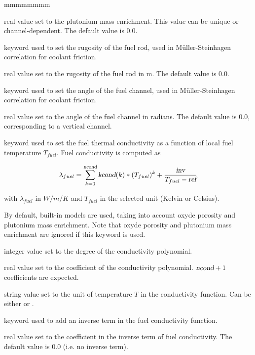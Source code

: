 \begin{ListeDeDescription}{mmmmmmmm}
\item[\dusa{pufr}] real value set to the plutonium mass enrichment. This value can be unique or channel-dependent. The default value is 0.0.

\item[\moc{F-RUG}] keyword used to set the rugosity of the fuel rod, used in M\"uller-Steinhagen correlation for coolant friction.

\item[\dusa{epsr}] real value set to the rugosity of the fuel rod in m. The default value is 0.0.

\item[\moc{THETA}] keyword used to set the angle of the fuel channel, used in M\"uller-Steinhagen correlation for coolant friction.

\item[\dusa{theta}] real value set to the angle of the fuel channel in radians. The default value is 0.0, corresponding to a vertical channel.

\item[\moc{CONDF}] keyword used to set the fuel thermal conductivity as a function of local fuel temperature $T_{fuel}$.
Fuel conductivity is computed as

$$\lambda_{fuel} = \sum_{k=0}^{\dusa{ncond}} {\dusa{kcond}(k)*(T_{fuel})^k + \frac{\dusa{inv}}{T_{fuel}-\dusa{ref}}}$$

with $\lambda_{fuel}$ in $W/m/K$ and $T_{fuel}$ in the selected unit (Kelvin or Celsius).

By default, built-in models are used, taking into account oxyde porosity and plutonium mass enrichment.
Note that oxyde porosity and plutonium mass enrichment are ignored if this keyword is used.

\item[\dusa{ncond}] integer value set to the degree of the conductivity polynomial.

\item[\dusa{kcond}] real value set to the coefficient of the conductivity polynomial. $\dusa{ncond}+1$ coefficients are expected.

\item[\dusa{unit}] string value set to the unit of temperature $T$ in the conductivity function. Can be either  or .

\item[\moc{INV}] keyword used to add an inverse term in the fuel conductivity function.

\item[\dusa{inv}] real value set to the coefficient in the inverse term of fuel conductivity.
The default value is 0.0 (i.e. no inverse term).


\end{ListeDeDescription}
